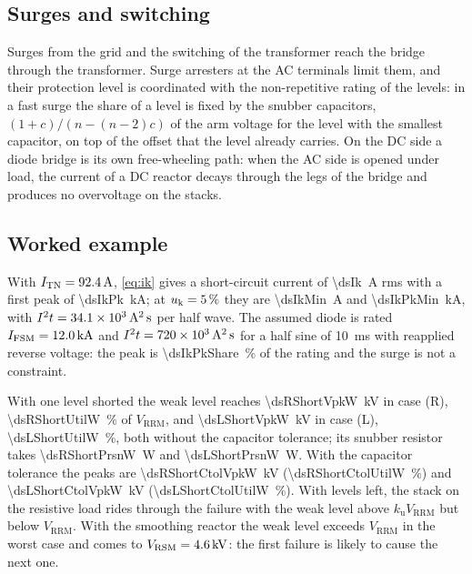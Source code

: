 \documentclass[10pt,a4paper]{scrartcl}
\newcommand{\Vrrm}{V_\mathrm{RRM}}
\newcommand{\Vrsm}{V_\mathrm{RSM}}
\newcommand{\uk}{u_\mathrm{k}}
\newcommand{\ku}{k_\mathrm{u}}
\newcommand{\caseR}{(R)}
\newcommand{\caseL}{(L)}
\begin{document}
\subsection{Surges and switching}
Surges from the grid and the switching of the transformer reach the bridge through the transformer. Surge arresters at the AC terminals limit them, and their protection level is coordinated with the non-repetitive rating of the levels: in a fast surge the share of a level is fixed by the snubber capacitors, $(1+c)/(n - (n-2)c)$ of the arm voltage for the level with the smallest capacitor, on top of the offset that the level already carries. On the DC side a diode bridge is its own free-wheeling path: when the AC side is opened under load, the current of a DC reactor decays through the legs of the bridge and produces no overvoltage on the stacks.

\subsection{Worked example}
With $I_\mathrm{TN} = \SI{92.4}{\ampere}$, \eqref{eq:ik} gives a short-circuit current of \SI{\dsIk}{\ampere} rms with a first peak of \SI{\dsIkPk}{\kilo\ampere}; at $\uk = \dsUkMin\,\%$ they are \SI{\dsIkMin}{\ampere} and \SI{\dsIkPkMin}{\kilo\ampere}, with $I^2t = \SI{34.1e3}{\ampere\squared\second}$ per half wave. The assumed diode is rated $I_\mathrm{FSM} = \SI{12.0}{\kilo\ampere}$ and $I^2t = \SI{720e3}{\ampere\squared\second}$ for a half sine of \SI{10}{\milli\second} with reapplied reverse voltage: the peak is \SI{\dsIkPkShare}{\percent} of the rating and the surge is not a constraint.

With one level shorted the weak level reaches \SI{\dsRShortVpkW}{\kilo\volt} in case \caseR{}, \SI{\dsRShortUtilW}{\percent} of $\Vrrm$, and \SI{\dsLShortVpkW}{\kilo\volt} in case \caseL{}, \SI{\dsLShortUtilW}{\percent}, both without the capacitor tolerance; its snubber resistor takes \SI{\dsRShortPrsnW}{\watt} and \SI{\dsLShortPrsnW}{\watt}. With the capacitor tolerance the peaks are \SI{\dsRShortCtolVpkW}{\kilo\volt} (\SI{\dsRShortCtolUtilW}{\percent}) and \SI{\dsLShortCtolVpkW}{\kilo\volt} (\SI{\dsLShortCtolUtilW}{\percent}). With \dsNminusWord{} levels left, the stack on the resistive load rides through the failure with the weak level above $\ku\Vrrm$ but below $\Vrrm$. With the smoothing reactor the weak level exceeds $\Vrrm$ in the worst case and comes to $\Vrsm = \SI{\dsVrsm}{\kilo\volt}$: the first failure is likely to cause the next one.
\end{document}
